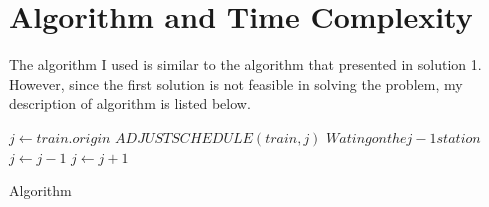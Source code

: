 \documentclass[letterpaper, 12pt, titlepage]{article}
\begin{document}
\section{Algorithm and Time Complexity}
The algorithm I used is similar to the algorithm that presented in solution 1. However, since the first solution is not feasible in solving the problem, my description of algorithm is listed below.
\begin{algorithm}
    \begin{algorithmic}
        \State $j\gets{}train.origin$
            \State $ADJUSTSCHEDULE(train, j)$
                \State $Wating on the j-1 station$
                \State $j\gets{}j-1$        
            \Else
            \State $j\gets{}j+1$        
            \EndIf
        \EndWhile
    \EndFor
    \end{algorithmic}
    \caption{Algorithm}
    \label{algo}
\end{algorithm}
\end{document}
